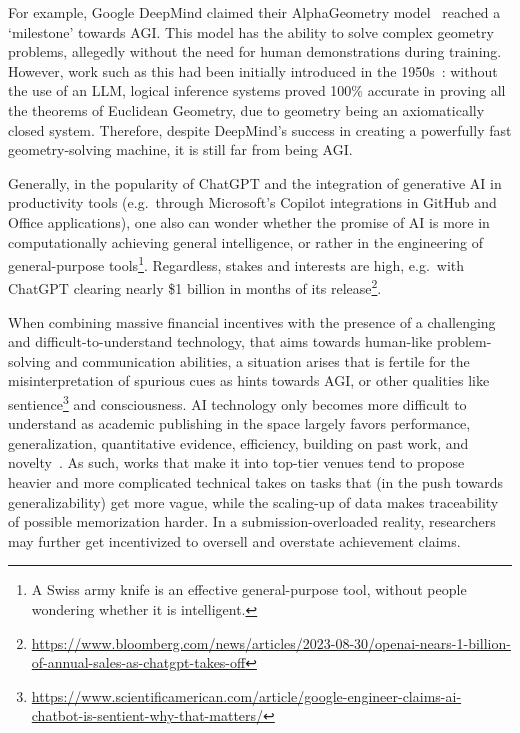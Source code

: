 \documentclass{article}
\theoremstyle{plain}
\theoremstyle{definition}
\theoremstyle{remark}
\begin{document}
For example, Google DeepMind claimed their AlphaGeometry model~\cite{trinh2024geometry} reached a `milestone' towards AGI. This model has the ability to solve complex geometry problems, allegedly without the need for human demonstrations during training. However, work such as this had been initially introduced in the 1950s~\cite{hector2024linkedin}: without the use of an LLM, logical inference systems proved 100\% accurate in proving all the theorems of Euclidean Geometry, due to geometry being an axiomatically closed system. Therefore, despite DeepMind's success in creating a powerfully fast geometry-solving machine, it is still far from being AGI.

Generally, in the popularity of ChatGPT and the integration of generative AI in productivity tools (e.g.\ through Microsoft's Copilot integrations in GitHub and Office applications), one also can wonder whether the promise of AI is more in computationally achieving general intelligence, or rather in the engineering of general-purpose tools\footnote{A Swiss army knife is an effective general-purpose tool, without people wondering whether it is intelligent.}. Regardless, stakes and interests are high, e.g.\ with ChatGPT clearing nearly \$1 billion in months of its release\footnote{\url{https://www.bloomberg.com/news/articles/2023-08-30/openai-nears-1-billion-of-annual-sales-as-chatgpt-takes-off}}.

When combining massive financial incentives with the presence of a challenging and difficult-to-understand technology, that aims towards human-like problem-solving and communication abilities, a situation arises that is fertile for the misinterpretation of spurious cues as hints towards AGI, or other qualities like sentience\footnote{\url{https://www.scientificamerican.com/article/google-engineer-claims-ai-chatbot-is-sentient-why-that-matters/}} and consciousness. AI technology only becomes more difficult to understand as academic publishing in the space largely favors performance, generalization, quantitative evidence, efficiency, building on past work, and novelty~\cite{values_in_ML}. As such, works that make it into top-tier venues tend to propose heavier and more complicated technical takes on tasks that (in the push towards generalizability) get more vague, while the scaling-up of data makes traceability of possible memorization harder. In a submission-overloaded reality, researchers may further get incentivized to oversell and overstate achievement claims.
\end{document}
